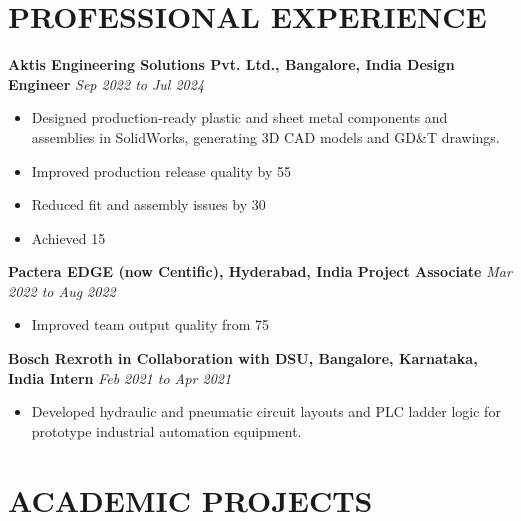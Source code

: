 \documentclass[a4paper,10pt]{article}
\begin{document}
\section{PROFESSIONAL EXPERIENCE}

\noindent \textbf{Aktis Engineering Solutions Pvt. Ltd., Bangalore, India \textbar{} Design Engineer} \hfill \textit{Sep 2022 to Jul 2024}
\begin{itemize}
  \item Designed production-ready plastic and sheet metal components and assemblies in SolidWorks, generating 3D CAD models and GD&T drawings.
\item Improved production release quality by 55%
\item Reduced fit and assembly issues by 30%
\item Achieved 15%
\end{itemize}

\vspace{2pt}
\noindent \textbf{Pactera EDGE (now Centific), Hyderabad, India \textbar{} Project Associate} \hfill \textit{Mar 2022 to Aug 2022}
\begin{itemize}
  \item Improved team output quality from 75%
\end{itemize}

\vspace{2pt}
\noindent \textbf{Bosch Rexroth in Collaboration with DSU, Bangalore, Karnataka, India \textbar{} Intern} \hfill \textit{Feb 2021 to Apr 2021}
\begin{itemize}
  \item Developed hydraulic and pneumatic circuit layouts and PLC ladder logic for prototype industrial automation equipment.
\end{itemize}

\section{ACADEMIC PROJECTS}
\end{document}
